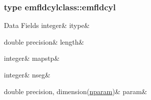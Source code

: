 \subsubsection{type emfldcylclass\+::emfldcyl}
\begin{DoxyFields}{Data Fields}
\mbox{\label{namespaceemfldcylclass_a3ba2c596d30c652482c75aa404dfbf85}} 
integer&
itype&
\\
\hline

\mbox{\label{namespaceemfldcylclass_a7db15b53a24d51010742b079320eaf82}} 
double precision&
length&
\\
\hline

\mbox{\label{namespaceemfldcylclass_ae91a238805ec7c8877fe7678af96d14f}} 
integer&
mapstp&
\\
\hline

\mbox{\label{namespaceemfldcylclass_a0e3fc4ea59fb87362a87c87bd7381c99}} 
integer&
nseg&
\\
\hline

\mbox{\label{namespaceemfldcylclass_aae12b122be9447025032a7afbb39d0ff}} 
double precision, dimension(\mbox{\hyperlink{namespaceemfldcylclass_a4b336ecf0cd4052beb8ac386391e19e9}{nparam}})&
param&
\\
\hline

\end{DoxyFields}
